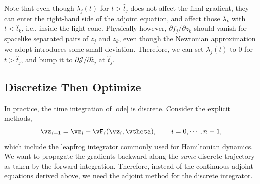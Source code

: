 \documentclass[modern, dvipsnames]{aastex631}
\newcommand{\p}{\partial}
\newcommand{\cJ}{\mathcal{J}}
\begin{document}
Note that even though $\lambda_j(t)$ for $t > \hat t_j$ does not affect
the final gradient, they can enter the right-hand side of the adjoint
equation, and affect those $\lambda_k$ with $t < \hat t_k$, i.e., inside
the light cone.
Physically however, $\p f_j / \p z_k$ should vanish for spacelike
separated pairs of $z_j$ and $z_k$, even though the Newtonian
approximation we adopt introduces some small deviation.
Therefore, we can set $\lambda_j(t)$ to 0 for $t > \hat t_j$, and bump
it to $\p\cJ / \p\hat z_j$ at $\hat t_j$.


\vspace{1em}
\subsection{Discretize Then Optimize}

In practice, the time integration of \eqref{ode} is discrete.
Consider the explicit methods,
%
\begin{equation}
\vz_{i+1} = \vz_i + \vF_i(\vz_i, \vtheta), \qquad i = 0, \cdots, n-1,
\label{explicit}
\end{equation}
%
which include the leapfrog integrator commonly used for Hamiltonian
dynamics.
We want to propagate the gradients backward along the \emph{same}
discrete trajectory as taken by the forward integration.
Therefore, instead of the continuous adjoint equations derived above, we
need the adjoint method for the discrete integrator.
\end{document}
